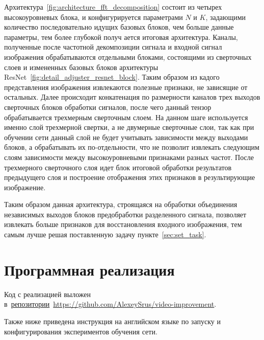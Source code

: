 Архитектура~\ref{fig:architecture_fft_decomposition} состоит из четырех высокоуровневых блока, и конфигурируется параметрами $N$ и $K$, задающими количество последовательно идущих базовых блоков, чем больше данные параметры, тем более глубокой получ ается итоговая архитектура. Каналы, полученные после частотной декомпозиции сигнала и входной сигнал изображения обрабатываются отдельными блоками, состоящими из сверточных слоев и измененных базовых блоков архитектуры ResNet~\ref{fig:detail_adjuster_resnet_block}. Таким образом из кадого представления изображения извлекаются полезные признаки, не зависящие от остальных. Далее происходит конкатенация по размерности каналов трех выходов сверточных блоков обработки сигналов, после чего данный тензор обрабатывается трехмерным сверточным слоем. На данном шаге используется именно слой трехмерной свертки, а не двумерные сверточные слои, так как при обучении сети данный слой не будет учитывать зависимости между выходами блоков, а обрабатывать их по-отдельности, что не позволит извлекать следующим слоям зависимости между высокоуровневыми признаками разных частот. После трехмерного сверточного слоя идет блок итоговой обработки результатов предыдущего слоя и построение отображения этих признаков в результирующие изображение. 

Таким образом данная архитектура, строящаяся на обработки объединения независимых выходов блоков предобработки разделенного сигнала, позволяет извлекать больше признаков для восстановления входного изображения, тем самым лучше решая поставленную задачу пункте~\ref{sec:set_task}.

\chapter{Программная реализация}


Код с реализацией выложен в~\href{https://github.com/AlexeySrus/video-improvement}{репозитории}~\url{https://github.com/AlexeySrus/video-improvement}. 

Также ниже приведена инструкция на английском языке по запуску и конфигурирования  экспериментов обучения сети.


